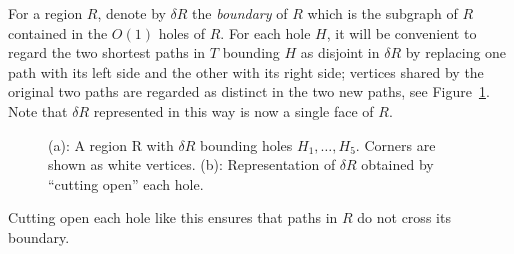 \documentclass[11pt]{article}
\begin{document}
For a region $R$, denote by $\delta R$ the \emph{boundary} of $R$ which is the subgraph of $R$ contained in the $O(1)$ holes of $R$. For each hole $H$, it will be convenient to regard the two shortest paths in $T$ bounding $H$ as disjoint in $\delta R$ by replacing one path with its left side and the other with its right side; vertices shared by the original two paths are regarded as distinct in the two new paths, see Figure~\ref{fig:EulerTour}. Note that $\delta R$ represented in this way is now a single face of $R$.
\begin{figure}\centerline{}
\caption{(a): A region R with $\delta R$ bounding holes $H_1,\ldots,H_5$. Corners are shown as white vertices. (b): Representation of $\delta R$ obtained by ``cutting open'' each hole.}
\label{fig:EulerTour}
\end{figure}
Cutting open each hole like this ensures that paths in $R$ do not cross its boundary.
\end{document}
